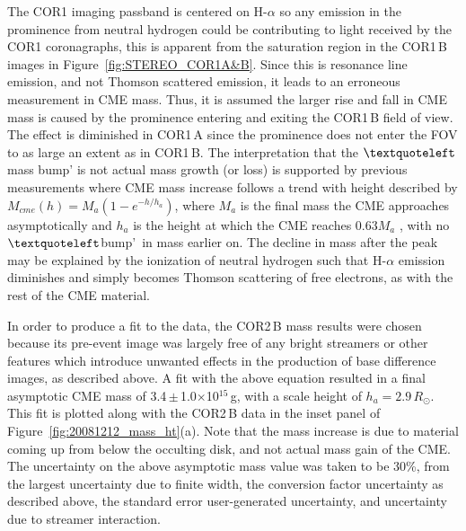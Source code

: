\clearpage
The COR1 imaging passband is centered on H-$\alpha$ so any emission in the prominence from neutral hydrogen could be contributing to light 
received by the COR1 coronagraphs, this is apparent from the saturation region in the COR1\,B images in Figure~\ref{fig:STEREO_COR1A&B}. Since this is resonance line 
emission, and not Thomson scattered emission, it leads to an erroneous measurement in CME mass. Thus, it is assumed the larger rise and fall in 
CME mass is caused by the prominence entering and exiting the COR1\,B field of view. The effect is diminished in COR1\,A since the prominence 
does not enter the FOV to as large an extent as in COR1\,B. The interpretation that the $\textquoteleft$mass bump' is not actual mass growth (or 
loss) is supported by previous measurements where CME mass increase follows a trend with height described by $M_{cme}(h)=M_{a}(1-e^{-h/h_a})
$, where $M_a$ is the final mass the CME approaches asymptotically and $h_a$ is the height at which the CME reaches 0.63$M_a$ \citep
{cola09}, with no  $\textquoteleft$bump'~in mass earlier on. The decline in mass after the peak may be explained by the ionization of neutral 
hydrogen such that H-$\alpha$ emission diminishes and simply becomes Thomson scattering of free electrons, as with the rest of the CME 
material. 

In order to produce a fit to the data, the COR2\,B mass results were chosen because its pre-event image was largely free of any bright streamers or 
other features which introduce unwanted effects in the production of base difference images, as described above. A fit with the above equation 
resulted in a final asymptotic CME mass of 3.4\,$\pm$\,1.0$\times$10$^{15}$\,g, with a scale height of $h_a=2.9\,R_{\odot}$. This fit is plotted 
along with the COR2\,B data in the inset panel of Figure~\ref{fig:20081212_mass_ht}(a). Note that the mass increase is due to material coming 
up from below the occulting disk, and not actual mass gain of the CME. The uncertainty on the above asymptotic mass value was taken to be 30\%, from the 
largest uncertainty  due to finite width, the conversion factor uncertainty as described above, the standard error user-generated uncertainty, and uncertainty due 
to streamer interaction.

